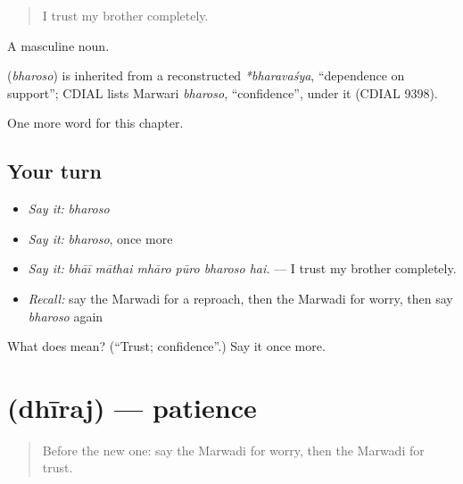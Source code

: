 \begin{quote}
I trust my brother completely.
\end{quote}

A masculine noun.

\begin{cousinweb}
\textbf{} (\emph{bharoso}) is inherited from a reconstructed \emph{*bharavaśya}, \textquotedblleft{}dependence on support\textquotedblright{}; CDIAL lists Marwari \emph{bharoso}, \textquotedblleft{}confidence\textquotedblright{}, under it (CDIAL 9398).
\end{cousinweb}

\begin{grammarlens}[title={What you've built}]
One more word for this chapter.
\end{grammarlens}

\subsection*{Your turn}
\begin{itemize}
\raggedright
  \item \emph{Say it:} \emph{bharoso}
  \item \emph{Say it:} \emph{bharoso}, once more
  \item \emph{Say it:} \emph{bhāī māthai mhāro pūro bharoso hai.} — I trust my brother completely.
  \item \emph{Recall:} say the Marwadi for a reproach, then the Marwadi for worry, then say \emph{bharoso} again
\end{itemize}

\begin{tcolorbox}[breakable,colback=teal!4,colframe=teal!35!black,title={Before you move on}]
What does  mean? (\textquotedblleft{}Trust; confidence\textquotedblright{}.) Say it once more.
\end{tcolorbox}
\section[\texorpdfstring{\mw{धीरज} (dhīraj)}{धीरज (dhīraj)}]{ (dhīraj) — patience}

\label{lesson:MW-C258-dhiraj}



\begin{quote}
Before the new one: say the Marwadi for worry, then the Marwadi for trust.
\end{quote}

